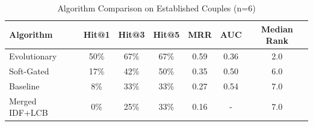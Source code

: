 \begin{table}[h]
\centering
\caption{Algorithm Comparison on Established Couples (n=6)}
\label{tab:algorithm-comparison}
\begin{tabular}{lcccccc}
\toprule
Algorithm & Hit@1 & Hit@3 & Hit@5 & MRR & AUC & Median Rank \\
\midrule
Evolutionary & 50\% & 67\% & 67\% & 0.59 & 0.36 & 2.0 \\
Soft-Gated & 17\% & 42\% & 50\% & 0.35 & 0.50 & 6.0 \\
Baseline & 8\% & 33\% & 33\% & 0.27 & 0.54 & 7.0 \\
Merged IDF+LCB & 0\% & 25\% & 33\% & 0.16 & - & 7.0 \\
\bottomrule
\end{tabular}
\end{table}